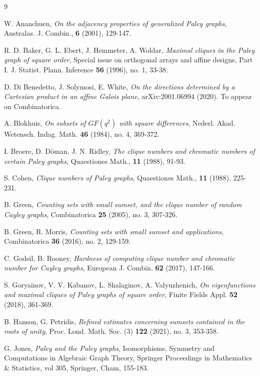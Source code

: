 \documentclass[12pt,oneside]{amsart}
\begin{document}
\begin{thebibliography}{9}

W. Ananchuen,
\emph{On the adjacency properties of generalized Paley graphs},
Australas. J. Combin., \textbf{6} (2001), 129-147.

R. D. Baker, G. L. Ebert, J. Hemmeter, A. Woldar,
\emph{Maximal cliques in the Paley graph of square order},  
Special issue on orthogonal arrays and affine designs, Part I. J. Statist. Plann. Inference \textbf{56} (1996), no. 1, 33-38. 

D. Di Benedetto, J. Solymosi, E. White,
\emph{On the directions determined by a Cartesian product in
an affine Galois plane},
arXiv:2001.06994 (2020). To appear on Combinatorica.

A. Blokhuis,
\emph{On subsets of $GF(q^2)$ with square differences}, 
Nederl. Akad. Wetensch. Indag. Math. \textbf{46} (1984), no. 4, 369-372. 

I. Broere, D. Döman, J. N. Ridley, 
\emph{The clique numbers and chromatic numbers of certain Paley graphs},
Quaestiones Math., \textbf{11} (1988), 91-93.

S. Cohen,
\emph{Clique numbers of Paley graphs},
Quaestiones Math., \textbf{11} (1988), 225-231.

B. Green, 
\emph{Counting sets with small sumset, and the clique number of random Cayley graphs}, 
Combinatorica \textbf{25} (2005), no. 3, 307-326.

B. Green, R. Morris,
\emph{Counting sets with small sumset and applications},
Combinatorica \textbf{36} (2016), no. 2, 129-159. 

C. Godsil, B. Rooney, 
\emph{Hardness of computing clique number and chromatic number for Cayley graphs}, 
European J. Combin. \textbf{62} (2017), 147-166. 

S. Goryainov,  V. V. Kabanov, L. Shalaginov, A. Valyuzhenich, 
\emph{On eigenfunctions and maximal cliques of Paley graphs of square order},  Finite Fields Appl. \textbf{52} (2018), 361-369. 

B. Hanson, G. Petridis,
\emph{Refined estimates concerning sumsets contained in the roots of unity},
Proc. Lond. Math. Soc. (3) \textbf{122} (2021), no. 3, 353-358.

G. Jones,
\emph{Paley and the Paley graphs},
Isomorphisms, Symmetry and Computations in Algebraic Graph Theory, Springer Proceedings in Mathematics \& Statistics, vol 305, Springer, Cham, 155-183.


\end{thebibliography}
\end{document}
